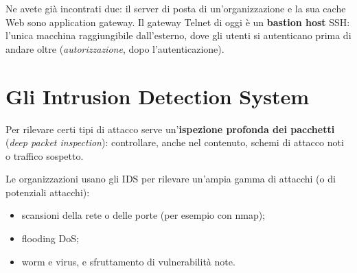 
Ne avete già incontrati due: il server di posta di un'organizzazione e la sua cache Web sono application gateway. Il gateway Telnet di
oggi è un \textbf{bastion host} SSH: l'unica macchina raggiungibile dall'esterno, dove gli utenti si autenticano prima di andare oltre
(\emph{autorizzazione}, dopo l'autenticazione).

\section{Gli Intrusion Detection System}

Per rilevare certi tipi di attacco serve un'\textbf{ispezione profonda dei pacchetti} (\emph{deep packet inspection}): controllare, anche nel
contenuto, schemi di attacco noti o traffico sospetto.


Le organizzazioni usano gli IDS per rilevare un'ampia gamma di attacchi (o di potenziali attacchi):

\begin{itemize}
    \item scansioni della rete o delle porte (per esempio con nmap);
    \item flooding DoS;
    \item worm e virus, e sfruttamento di vulnerabilità note.
\end{itemize}

